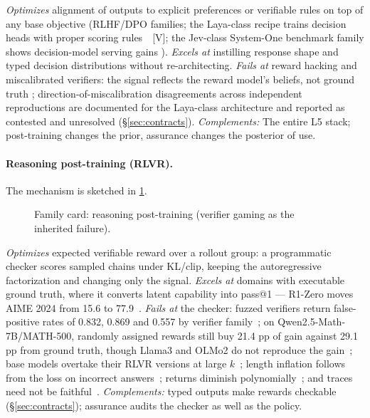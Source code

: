 \documentclass[11pt]{article}
\newcommand{\evvendor}[1]{#1~\textsf{[V]}}    %
\begin{document}
\textit{Optimizes} alignment of outputs to explicit preferences or verifiable rules on top of
any base objective (RLHF/DPO families; the Laya-class recipe trains decision heads with proper scoring
rules~\evvendor{}; the Jev-class System-One benchmark family shows decision-model
serving gains \cite{rauk2026jevbenchmark}). \textit{Excels at} instilling response shape
and typed decision distributions without re-architecting. \textit{Fails at} reward hacking and
miscalibrated verifiers: the signal reflects the reward model's beliefs, not ground truth
\cite{gao2022overoptimization,id260601066}; direction-of-miscalibration disagreements across independent reproductions
are documented for the Laya-class architecture and reported as contested and unresolved
(\S\ref{sec:contracts}). \textit{Complements:} The entire L5 stack; post-training changes the
prior, assurance changes the posterior of use.

\paragraph{Reasoning post-training (RLVR).}
\noindent The mechanism is sketched in \cref{fig:fam-reasoning}.

\begin{figure}[t]\centering
  \resizebox{\linewidth}{!}{}
  \caption{Family card: reasoning post-training (verifier gaming as the inherited failure).}
  \label{fig:fam-reasoning}
\end{figure}

\textit{Optimizes} expected verifiable reward over a rollout group: a programmatic checker scores
sampled chains under KL/clip, keeping the autoregressive factorization and changing only the
signal. \textit{Excels at} domains with executable ground truth, where it converts latent capability
into pass@1 --- R1-Zero moves AIME 2024 from 15.6 to 77.9~\cite{id250112948}. \textit{Fails at} the
checker: fuzzed verifiers return false-positive rates of 0.832, 0.869 and 0.557 by verifier
family~\cite{id260601066}; on Qwen2.5-Math-7B/MATH-500, randomly assigned rewards still buy
21.4 pp of gain against 29.1 pp from ground truth, though Llama3 and OLMo2 do not reproduce the
gain~\cite{id250610947}; base models overtake their RLVR versions at large $k$~\cite{id250413837};
length inflation follows from the loss on incorrect answers~\cite{id250405185}; returns diminish
polynomially~\cite{id261019362}; and traces need not be
faithful~\cite{id230504388}. \textit{Complements:} typed outputs make rewards checkable
(\S\ref{sec:contracts}); assurance audits the checker as well as the policy.
\end{document}
